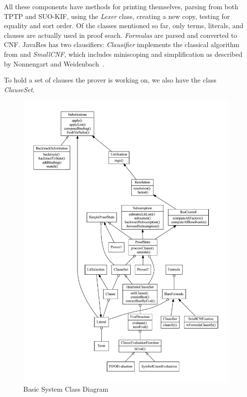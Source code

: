 \documentclass{llncs}
\begin{document}
All these components have methods for printing themselves, parsing
from both TPTP and SUO-KIF, using the \emph{Lexer} class, creating a new
copy, testing for equality and sort order. Of the classes mentioned so
far, only terms, literals, and clauses are actually used in proof
seach.  \emph{Formulas} are parsed and converted to CNF.  JavaRes has
two clausifiers: \emph{Clausifier} implements the classical algorithm
from \cite{RN:AI-95} and \emph{SmallCNF}, which includes miniscoping
and simplification as described by Nonnengart and
Weidenbach~\cite{NW:SmallCNF-2001}.

To hold a set of clauses the prover is working on, we also have the
class \emph{ClauseSet}.

\begin{figure}
  \centering
  \includegraphics[width=6in]{architecture.pdf}
  \caption{Basic System Class Diagram}
  \label{fig:SysArch}
\end{figure}
\end{document}
